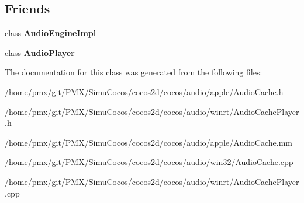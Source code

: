 \subsection*{Friends}
\begin{DoxyCompactItemize}
\item 
\mbox{\label{classexperimental_1_1AudioCache_a8e0222d6e9b81346186667563adf95a7}} 
class {\bfseries Audio\+Engine\+Impl}
\item 
\mbox{\label{classexperimental_1_1AudioCache_a4f2913cb16104e659170b8f566839fe6}} 
class {\bfseries Audio\+Player}
\end{DoxyCompactItemize}


The documentation for this class was generated from the following files\+:\begin{DoxyCompactItemize}
\item 
/home/pmx/git/\+P\+M\+X/\+Simu\+Cocos/cocos2d/cocos/audio/apple/Audio\+Cache.\+h\item 
/home/pmx/git/\+P\+M\+X/\+Simu\+Cocos/cocos2d/cocos/audio/winrt/Audio\+Cache\+Player.\+h\item 
/home/pmx/git/\+P\+M\+X/\+Simu\+Cocos/cocos2d/cocos/audio/apple/Audio\+Cache.\+mm\item 
/home/pmx/git/\+P\+M\+X/\+Simu\+Cocos/cocos2d/cocos/audio/win32/Audio\+Cache.\+cpp\item 
/home/pmx/git/\+P\+M\+X/\+Simu\+Cocos/cocos2d/cocos/audio/winrt/Audio\+Cache\+Player.\+cpp\end{DoxyCompactItemize}
